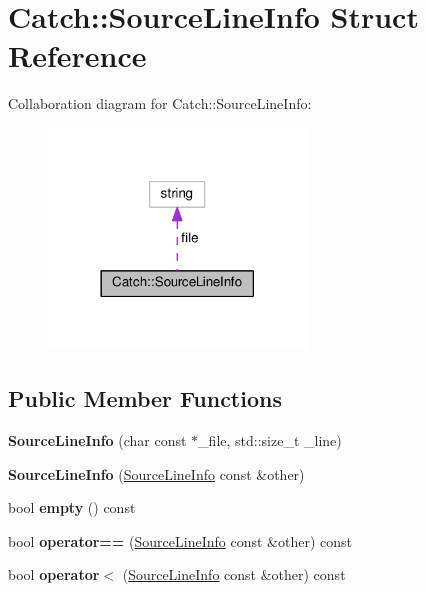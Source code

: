 \hypertarget{structCatch_1_1SourceLineInfo}{}\section{Catch\+:\+:Source\+Line\+Info Struct Reference}
\label{structCatch_1_1SourceLineInfo}


Collaboration diagram for Catch\+:\+:Source\+Line\+Info\+:
\nopagebreak
\begin{figure}[H]
\begin{center}
\leavevmode
\includegraphics[width=194pt]{structCatch_1_1SourceLineInfo__coll__graph}
\end{center}
\end{figure}
\subsection*{Public Member Functions}
\begin{DoxyCompactItemize}
\item 
{\bfseries Source\+Line\+Info} (char const $\ast$\+\_\+file, std\+::size\+\_\+t \+\_\+line)\hypertarget{structCatch_1_1SourceLineInfo_a6218cb890337d37f708ea94063958940}{}\label{structCatch_1_1SourceLineInfo_a6218cb890337d37f708ea94063958940}

\item 
{\bfseries Source\+Line\+Info} (\hyperlink{structCatch_1_1SourceLineInfo}{Source\+Line\+Info} const \&other)\hypertarget{structCatch_1_1SourceLineInfo_a1ec99cc0547ce5909133aaa8f14ed4b1}{}\label{structCatch_1_1SourceLineInfo_a1ec99cc0547ce5909133aaa8f14ed4b1}

\item 
bool {\bfseries empty} () const \hypertarget{structCatch_1_1SourceLineInfo_a9a25ffc0640d1a3dd0c9b7e5fcbba7b9}{}\label{structCatch_1_1SourceLineInfo_a9a25ffc0640d1a3dd0c9b7e5fcbba7b9}

\item 
bool {\bfseries operator==} (\hyperlink{structCatch_1_1SourceLineInfo}{Source\+Line\+Info} const \&other) const \hypertarget{structCatch_1_1SourceLineInfo_af0854821b1abfda52796ef0f1294b050}{}\label{structCatch_1_1SourceLineInfo_af0854821b1abfda52796ef0f1294b050}

\item 
bool {\bfseries operator$<$} (\hyperlink{structCatch_1_1SourceLineInfo}{Source\+Line\+Info} const \&other) const \hypertarget{structCatch_1_1SourceLineInfo_a581c02d683808232168bfc2e775c3554}{}\label{structCatch_1_1SourceLineInfo_a581c02d683808232168bfc2e775c3554}

\end{DoxyCompactItemize}
